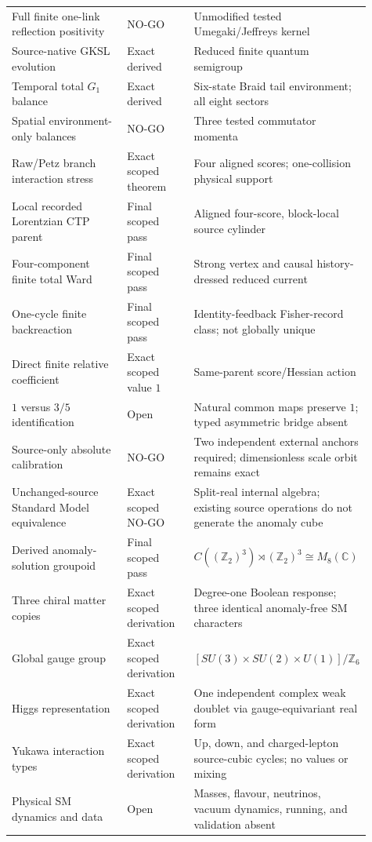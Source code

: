 \documentclass[11pt]{article}
\theoremstyle{definition}
\theoremstyle{remark}
\begin{document}
\begin{longtable}{>{\raggedright\arraybackslash}p{0.34\linewidth} >{\raggedright\arraybackslash}p{0.19\linewidth} >{\raggedright\arraybackslash}p{0.38\linewidth}}
Full finite one-link reflection positivity & NO-GO & Unmodified tested Umegaki/Jeffreys kernel \\
Source-native GKSL evolution & Exact derived & Reduced finite quantum semigroup \\
Temporal total $G_1$ balance & Exact derived & Six-state Braid tail environment; all eight sectors \\
Spatial environment-only balances & NO-GO & Three tested commutator momenta \\
Raw/Petz branch interaction stress & Exact scoped theorem & Four aligned scores; one-collision physical support \\
Local recorded Lorentzian CTP parent & Final scoped pass & Aligned four-score, block-local source cylinder \\
Four-component finite total Ward & Final scoped pass & Strong vertex and causal history-dressed reduced current \\
One-cycle finite backreaction & Final scoped pass & Identity-feedback Fisher-record class; not globally unique \\
Direct finite relative coefficient & Exact scoped value $1$ & Same-parent score/Hessian action \\
$1$ versus $3/5$ identification & Open & Natural common maps preserve $1$; typed asymmetric bridge absent \\
Source-only absolute calibration & NO-GO & Two independent external anchors required; dimensionless scale orbit remains exact \\
Unchanged-source Standard Model equivalence & Exact scoped NO-GO & Split-real internal algebra; existing source operations do not generate the anomaly cube \\
Derived anomaly-solution groupoid & Final scoped pass & $C((\mathbb Z_2)^3)\rtimes(\mathbb Z_2)^3\cong M_8(\mathbb C)$ \\
Three chiral matter copies & Exact scoped derivation & Degree-one Boolean response; three identical anomaly-free SM characters \\
Global gauge group & Exact scoped derivation & $[SU(3)\times SU(2)\times U(1)]/\mathbb Z_6$ \\
Higgs representation & Exact scoped derivation & One independent complex weak doublet via gauge-equivariant real form \\
Yukawa interaction types & Exact scoped derivation & Up, down, and charged-lepton source-cubic cycles; no values or mixing \\
Physical SM dynamics and data & Open & Masses, flavour, neutrinos, vacuum dynamics, running, and validation absent \\

\end{longtable}
\end{document}
